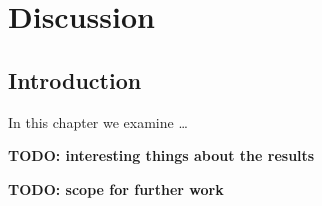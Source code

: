 %
%
%
%

\chapter{Discussion}\label{C.discussion}

\section{Introduction}\label{S.intro6}

In this chapter we examine \ldots

\textbf{TODO: interesting things about the results}

\textbf{TODO: scope for further work}
